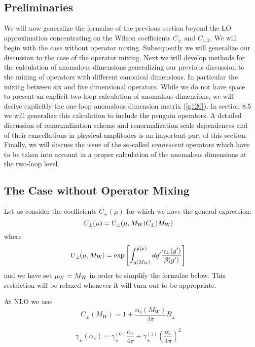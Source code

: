 \documentclass[12pt,rotate]{article}
\def\as{\alpha_s}
\newcommand{\mw}{M_{\rm W}}
\def\aspi{\frac{\as}{4\pi}}
\begin{document}
\begin{itemize}
\begin{itemize}
\begin{itemize}
\subsection{Preliminaries}
We will now generalize the formulae of the previous section beyond
the LO approximation concentrating on the Wilson coefficients $C_{\pm}$
and $C_{1,2}$. We will begin with the case without operator mixing.
Subsequently we will generalize our discussion 
 to the case of the operator mixing. Next we will
develop methods for the calculation of anomalous dimensions
generalizing our previous discussion 
to the mixing of operators with different canonical
dimensions. In particular the mixing between six and five dimensional
operators.
While we do not have space to present an explicit two-loop calculation
of anomalous dimensions, we will derive explicitly the one-loop anomalous
dimension matrix (\ref{g120}). In section 8.5 we will generalize this
calculation to include the penguin operators.
A detailed discussion of renormalization scheme
and renormalization scale dependences and of their cancellations in
physical amplitudes is an important part of this section. Finally,
we will discuss the issue of the so-called {\it evanescent}
operators which have to be taken into account in a proper calculation
of the anomalous dimensions at the two-loop level. 
\subsection{The Case without Operator Mixing}
Let us consider the coefficients $C_\pm(\mu)$
for which we have the general expression:
\begin{equation}\label{C1+-}
 C_\pm(\mu) = U_\pm(\mu,\mw) C_\pm(\mw) 
  \end{equation}
where 
\begin{equation}\label{U1+-}
U_\pm(\mu,\mw)= \exp \left[ 
  \int_{g(\mw)}^{g(\mu)}{dg' \frac{\gamma_\pm(g')}{\beta(g')}}\right] 
\end{equation}
and we have set $\mu_W=\mw$ in order to simplify the formulae below.
This restriction will be relaxed whenever it will turn out to be 
appropriate.

At NLO we use:
\begin{equation}\label{B8}
C_\pm(M_W)=1+\frac{\as(M_W)}{4\pi}B_\pm
\end{equation}

\begin{equation}\label{gg01P}
\gamma_\pm(\as)=\gamma_\pm^{(0)}\aspi + \gamma_\pm^{(1)}\left(\aspi\right)^2
\end{equation}


\end{itemize}
\end{itemize}
\end{itemize}
\end{document}
